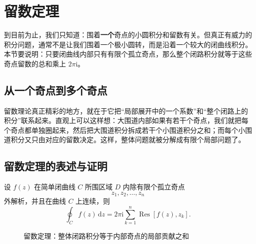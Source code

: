 \section{留数定理}

\begin{wulibj}[本节的任务]
到目前为止，我们只知道：围着\textbf{一个}奇点的小圆积分和留数有关。但真正有威力的积分问题，通常不是让我们围着一个极小圆转，而是沿着一个较大的闭曲线积分。本节要说明：只要闭曲线内部只有有限个孤立奇点，那么整个闭路积分就等于这些奇点留数的总和乘上 $2\pi \mathrm{i}$。
\end{wulibj}

\subsection{从一个奇点到多个奇点}

留数理论真正精彩的地方，就在于它把``局部展开中的一个系数''和``整个闭路上的积分''联系起来。直观上可以这样想：大围道内部如果有若干个奇点，我们就把每个奇点都单独圈起来，然后把大围道积分拆成若干个小围道积分之和；而每个小围道积分又只由对应的留数决定。这样，整体问题就被分解成有限个局部问题了。

\subsection{留数定理的表述与证明}

\begin{zhongyao}[留数定理]
设 $f(z)$ 在简单闭曲线 $C$ 所围区域 $D$ 内除有限个孤立奇点
\[
    z_1,z_2,\dots,z_n
\]
外解析，并且在曲线 $C$ 上连续，则
\[
    \oint_C f(z)\,\mathrm{d}z
    =
    2\pi \mathrm{i}\sum_{k=1}^{n}\operatorname{Res}[f(z),z_k].
\]
\end{zhongyao}

\begin{figure}[htbp]
\centering
{}
\caption{留数定理：整体闭路积分等于内部奇点的局部贡献之和}
\label{fig:residue-theorem}
\end{figure}

